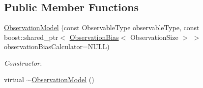 \subsection*{Public Member Functions}
\begin{DoxyCompactItemize}
\item 
\hyperlink{classtudat_1_1observation__models_1_1ObservationModel_a3cf3a0c2d483f193dee6af1940ff819c}{Observation\+Model} (const Observable\+Type observable\+Type, const boost\+::shared\+\_\+ptr$<$ \hyperlink{classtudat_1_1observation__models_1_1ObservationBias}{Observation\+Bias}$<$ Observation\+Size $>$ $>$ observation\+Bias\+Calculator=N\+U\+LL)
\begin{DoxyCompactList}\small\item\em Constructor. \end{DoxyCompactList}\item 
virtual \hyperlink{classtudat_1_1observation__models_1_1ObservationModel_a33f5919bec46354f53e05fce0582d69d}{$\sim$\+Observation\+Model} ()\hypertarget{classtudat_1_1observation__models_1_1ObservationModel_a33f5919bec46354f53e05fce0582d69d}{}\label{classtudat_1_1observation__models_1_1ObservationModel_a33f5919bec46354f53e05fce0582d69d}


\end{DoxyCompactItemize}
